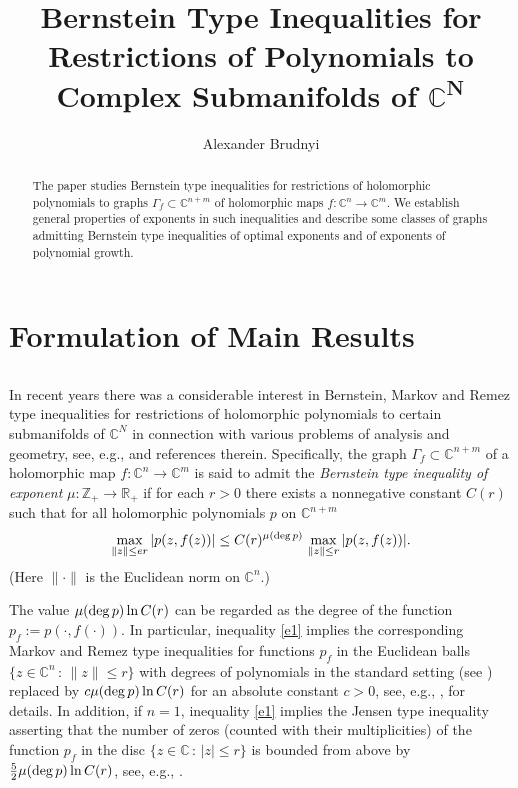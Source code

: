 \documentclass[11pt, oneside]{amsart}
\title[Bernstein Type Inequalities for Restrictions of Polynomials]{Bernstein Type Inequalities for Restrictions of Polynomials to Complex Submanifolds of ${\mathbf {\mathbb C^N}}$ }
\author{Alexander Brudnyi}
\date{}
\begin{document}
\begin{abstract}
The paper studies Bernstein type inequalities for restrictions of holomorphic polynomials to graphs $\Gamma_f\subset\mathbb C^{n+m}$ of holomorphic maps $f:\mathbb C^n\rightarrow\mathbb C^m$.  We establish general properties of exponents in such inequalities and describe some classes of graphs admitting Bernstein type inequalities of optimal exponents and of exponents of polynomial growth.  
\end{abstract}

\maketitle

\section{Formulation of Main Results}
\subsection{} In recent years there was a considerable interest in Bernstein, Markov and Remez type inequalities for restrictions of holomorphic polynomials to certain submanifolds of $\mathbb C^N$  in connection with various problems of analysis and geometry, see, e.g., \cite{B, BBL, BBLT, BLMT, BP, CP1, CP2, CP3, FN1, FN2, NSV, P, RY, S} and references therein. 
Specifically, the graph $\Gamma_f\subset\mathbb C^{n+m}$ of a holomorphic map $f:\mathbb C^n\rightarrow\mathbb C^m$ is said to admit the {\em Bernstein type inequality of exponent} $\mu:\mathbb Z_+\rightarrow\mathbb R_+$ if for each $r>0$ there exists a nonnegative constant $C(r)$ such that for all holomorphic polynomials $p$ on $\mathbb C^{n+m}$
\begin{equation}\label{e1}
\max_{\|z\|\le er} |p(z,f(z))|\le C(r)^{\mu({\rm deg}\,p)} \,\max_{\|z\|\le r} |p(z,f(z))|.
\end{equation}
(Here $\|\cdot\|$ is the Euclidean norm on $\mathbb C^{n}$.)\smallskip

The value $\mu({\rm deg}\, p)\ln C(r)$ can be regarded as the degree of the function $p_f:=p(\cdot, f(\cdot))$. In particular, inequality \eqref{e1} implies the corresponding Markov and Remez type inequalities for functions $p_f$ in the Euclidean balls $\{z\in\mathbb C^n\, :\, \|z\|\le r\}$ with degrees of polynomials in the standard setting (see \cite{Ma, Be, R, BG}) replaced by $c\mu({\rm deg}\,p)\ln C(r)$ for an absolute constant $c>0$, see, e.g., \cite[Sect.~2]{B}, \cite{BLMT} for details.
In addition, if $n=1$, inequality \eqref{e1} implies the Jensen type inequality asserting that the number of zeros (counted with their multiplicities)
of  the function $p_f$ in the disc $\{z\in\mathbb C\, :\, |z|\le r\}$ is bounded from above by $\frac 52\mu({\rm deg}\,p)\ln C(r)$, see, e.g., \cite{VP}.
\end{document}
